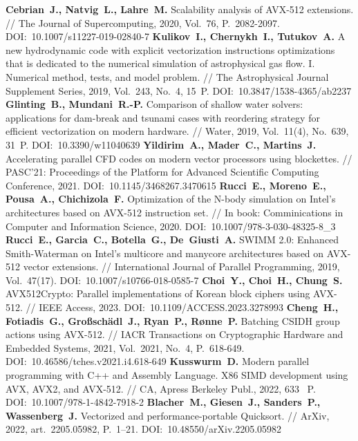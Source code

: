 \begin{thebibliography}{99}
%
\textbf{Cebrian~J., Natvig~L., Lahre~M.} Scalability analysis of AVX-512 extensions. // The Journal of Supercomputing, 2020, Vol.~76, P.~2082-2097. DOI:~10.1007/s11227-019-02840-7
%
\textbf{Kulikov~I., Chernykh~I., Tutukov~A.} A new hydrodynamic code with explicit vectorization instructions optimizations that is dedicated to the numerical simulation of astrophysical gas flow. I. Numerical method, tests, and model problem. // The Astrophysical Journal Supplement Series, 2019, Vol.~243, No.~4, 15~P. DOI:~10.3847/1538-4365/ab2237
%
\textbf{Glinting~B., Mundani~R.-P.} Comparison of shallow water solvers: applications for dam-break and tsunami cases with reordering strategy for efficient vectorization on modern hardware. // Water, 2019, Vol.~11(4), No.~639, 31~P. DOI:~10.3390/w11040639
%
\textbf{Yildirim~A., Mader~C., Martins~J.} Accelerating parallel CFD codes on modern vector processors using blockettes. // PASC’21: Proceedings of the Platform for Advanced Scientific Computing Conference, 2021.
DOI:~10.1145/3468267.3470615
%
\textbf{Rucci~E., Moreno~E., Pousa~A., Chichizola~F.} Optimization of the N-body simulation on Intel’s architectures based on AVX-512 instruction set. // In book: Comminications in Computer and Information Science, 2020.
DOI:~10.1007/978-3-030-48325-8\_3
%
\textbf{Rucci~E., Garcia~C., Botella~G., De~Giusti~A.} SWIMM 2.0: Enhanced Smith-Waterman on Intel’s multicore and manycore architectures based on AVX-512 vector extensions. // International Journal of Parallel Programming,
2019, Vol.~47(17). DOI:~10.1007/s10766-018-0585-7
%
\textbf{Choi~Y., Choi~H., Chung~S.} AVX512Crypto: Parallel implementations of Korean block ciphers using AVX-512. // IEEE Access, 2023. DOI:~10.1109/ACCESS.2023.3278993
%
\textbf{Cheng~H., Fotiadis~G., Gro{\ss}sch{\"a}dl~J., Ryan~P., R{\o}nne~P.} Batching CSIDH group actions using AVX-512. // IACR Transactions on Cryptographic Hardware and Embedded Systems, 2021, Vol.~2021, No.~4, P.~618-649. DOI:~10.46586/tches.v2021.i4.618-649
%
%
\textbf{Kusswurm~D.} Modern parallel programming with C++ and Assembly Language. X86 SIMD development using AVX, AVX2, and AVX-512. // CA, Apress Berkeley Publ., 2022, 633~ P. DOI:~10.1007/978-1-4842-7918-2
%
\textbf{Blacher~M., Giesen~J., Sanders~P., Wassenberg~J.} Vectorized and performance-portable Quicksort. // ArXiv, 2022, art.~2205.05982, P.~1–21. DOI:~10.48550/arXiv.2205.05982

\end{thebibliography}
